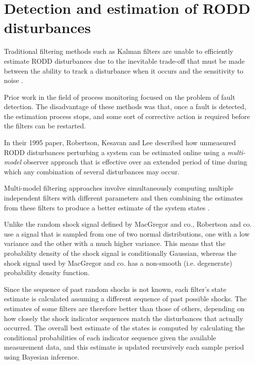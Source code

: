\section*{Detection and estimation of RODD disturbances}\label{detection_RODDs}

Traditional filtering methods such as Kalman filters are unable to efficiently estimate RODD disturbances due to the inevitable trade-off that must be made between the ability to track a disturbance when it occurs and the sensitivity to noise \cite{robertson_detection_1995}.

Prior work in the field of process monitoring focused on the problem of fault detection. The disadvantage of these methods was that, once a fault is detected, the estimation process stops, and some sort of corrective action is required before the filters can be restarted. 

In their 1995 paper, Robertson, Kesavan and Lee \cite{robertson_detection_1995} described how unmeasured RODD disturbances perturbing a system can be estimated online using a \textit{multi-model} observer approach that is effective over an extended period of time during which any combination of several disturbances may occur.

Multi-model filtering approaches involve simultaneously computing multiple independent filters with different parameters and then combining the estimates from these filters to produce a better estimate of the system states \cite{jaffer_estimation_1971, buxbaum_recursive_1970, tugnait_detection_1982}.

Unlike the random shock signal defined by MacGregor and co., Robertson and co. use a signal that is sampled from one of two normal distributions, one with a low variance and the other with a much higher variance. This means that the probability density of the shock signal is conditionally Gaussian, whereas the shock signal used by MacGregor and co. has a non-smooth (i.e. degenerate) probability density function.

Since the sequence of past random shocks is not known, each filter's state estimate is calculated assuming a different sequence of past possible shocks. The estimates of some filters are therefore better than those of others, depending on how closely the shock indicator sequences match the disturbances that actually occurred. The overall best estimate of the states is computed by calculating the conditional probabilities of each indicator sequence given the available measurement data, and this estimate is updated recursively each sample period using Bayesian inference.

